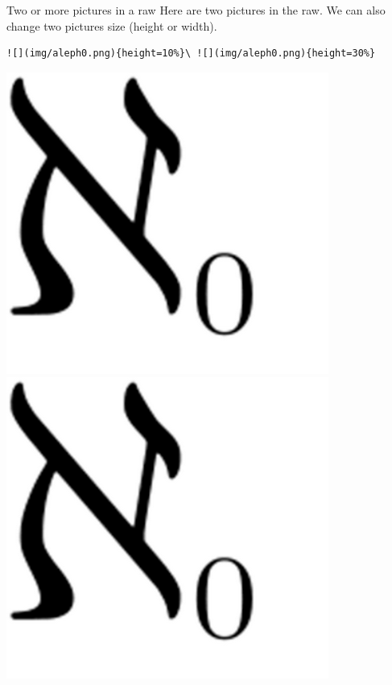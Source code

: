 \documentclass[
  11pt,
  ignorenonframetext,
  aspectratio=169,
  aspectratio=169]{beamer}
\begin{document}
\begin{frame}[fragile]{Two or more pictures in a raw}
\protect\hypertarget{two-or-more-pictures-in-a-raw}{}
Here are two pictures in the raw. We can also change two pictures size
(height or width).

\begin{block}{}
\protect\hypertarget{section-1}{}
\begin{lstlisting}
![](img/aleph0.png){height=10%}\ ![](img/aleph0.png){height=30%} 
\end{lstlisting}

\includegraphics[width=\textwidth,height=0.1\textheight]{img/aleph0.png}~\includegraphics[width=\textwidth,height=0.3\textheight]{img/aleph0.png}
\end{block}
\end{frame}
\end{document}
